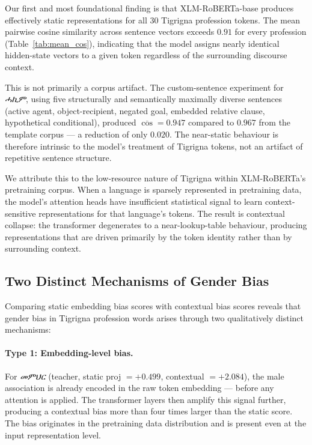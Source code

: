 Our first and most foundational finding is that XLM-RoBERTa-base produces
effectively static representations for all 30 Tigrigna profession tokens.
The mean pairwise cosine similarity across sentence vectors exceeds $0.91$ for
every profession (Table~\ref{tab:mean_cos}), indicating that the model assigns
nearly identical hidden-state vectors to a given token regardless of the
surrounding discourse context.

This is not primarily a corpus artifact. The custom-sentence experiment
for \textit{ሓኪም}, using five structurally and semantically maximally diverse
sentences (active agent, object-recipient, negated goal, embedded relative
clause, hypothetical conditional), produced $\overline{\cos} = 0.947$ compared
to $0.967$ from the template corpus — a reduction of only $0.020$. The near-static
behaviour is therefore intrinsic to the model's treatment of Tigrigna tokens,
not an artifact of repetitive sentence structure.

We attribute this to the low-resource nature of Tigrigna within XLM-RoBERTa's
pretraining corpus. When a language is sparsely represented in pretraining data,
the model's attention heads have insufficient statistical signal to learn
context-sensitive representations for that language's tokens. The result is
contextual collapse: the transformer degenerates to a near-lookup-table
behaviour, producing representations that are driven primarily by the token
identity rather than by surrounding context.

\subsection{Two Distinct Mechanisms of Gender Bias}

Comparing static embedding bias scores with contextual bias scores reveals that
gender bias in Tigrigna profession words arises through two qualitatively
distinct mechanisms:

\paragraph{Type 1: Embedding-level bias.}
For \textit{መምህር} (teacher, static proj $= +0.499$, contextual $= +2.084$),
the male association is already encoded in the raw token embedding — before
any attention is applied. The transformer layers then amplify this signal
further, producing a contextual bias more than four times larger than the
static score. The bias originates in the pretraining data distribution and is
present even at the input representation level.

